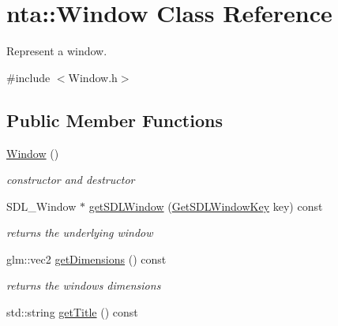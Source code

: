 \hypertarget{classnta_1_1Window}{}\section{nta\+:\+:Window Class Reference}
\label{classnta_1_1Window}


Represent a window.  




{\ttfamily \#include $<$Window.\+h$>$}

\subsection*{Public Member Functions}
\begin{DoxyCompactItemize}
\item 
\mbox{\label{classnta_1_1Window_a28534e4bb354c4b38b1d97aed78fd010}} 
\hyperlink{classnta_1_1Window_a28534e4bb354c4b38b1d97aed78fd010}{Window} ()
\begin{DoxyCompactList}\small\item\em constructor and destructor \end{DoxyCompactList}\item 
\mbox{\label{classnta_1_1Window_a916d03b7cf059118106a4098eab11175}} 
S\+D\+L\+\_\+\+Window $\ast$ \hyperlink{classnta_1_1Window_a916d03b7cf059118106a4098eab11175}{get\+S\+D\+L\+Window} (\hyperlink{classnta_1_1GetSDLWindowKey}{Get\+S\+D\+L\+Window\+Key} key) const
\begin{DoxyCompactList}\small\item\em returns the underlying window \end{DoxyCompactList}\item 
\mbox{\label{classnta_1_1Window_a461977bc0033732836ec56615ca0aa83}} 
glm\+::vec2 \hyperlink{classnta_1_1Window_a461977bc0033732836ec56615ca0aa83}{get\+Dimensions} () const
\begin{DoxyCompactList}\small\item\em returns the window\textquotesingle{}s dimensions \end{DoxyCompactList}\item 
\mbox{\label{classnta_1_1Window_a91f2eeac996c2f863b92601f8bb459aa}} 
std\+::string \hyperlink{classnta_1_1Window_a91f2eeac996c2f863b92601f8bb459aa}{get\+Title} () const

\end{DoxyCompactItemize}
